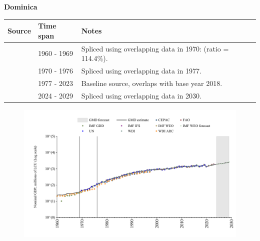 \documentclass[12pt,a4paper,landscape]{article}
\begin{document}
\begin{adjustbox}{max totalsize={\paperwidth}{\paperheight},center}
\begin{minipage}[t][\textheight][t]{\textwidth}
\vspace*{0.5cm}
{}
\begin{center}
{\Large\bfseries Dominica}
\end{center}
\vspace{0.5cm}
\begin{table}[H]
\centering
\small
\begin{tabular}{|l|l|l|}
\hline
\textbf{Source} & \textbf{Time span} & \textbf{Notes} \\
\hline
\rowcolor{white}\cite{WDI_ARC}& 1960 - 1969 &Spliced using overlapping data in 1970: (ratio = 114.4\%).\\
\rowcolor{lightgray}\cite{UN}& 1970 - 1976 &Spliced using overlapping data in 1977.\\
\rowcolor{white}\cite{WDI}& 1977 - 2023 &Baseline source, overlaps with base year 2018.\\
\rowcolor{lightgray}\cite{IMF_WEO_forecast}& 2024 - 2029 &Spliced using overlapping data in 2030.\\
\hline
\end{tabular}
\end{table}
\begin{figure}[H]
\centering
\includegraphics[width=\textwidth,height=0.6\textheight,keepaspectratio]{graphs/DMA_nGDP.pdf}
\end{figure}
\end{minipage}
\end{adjustbox}
\end{document}
